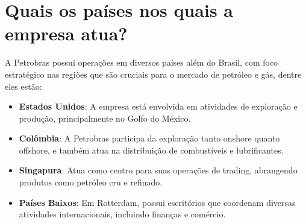 \section{Quais os países nos quais a empresa atua?}

A Petrobras possui operações em diversos países além do Brasil, com foco estratégico nas regiões que são cruciais para o mercado de petróleo e gás, dentre eles estão:

\begin{itemize}
    \item \textbf{Estados Unidos}: A empresa está envolvida em atividades de exploração e produção, principalmente no Golfo do México.
    \item \textbf{Colômbia}: A Petrobras participa da exploração tanto onshore quanto offshore, e também atua na distribuição de combustíveis e lubrificantes.
    \item \textbf{Singapura}: Atua como centro para suas operações de trading, abrangendo produtos como petróleo cru e refinado.
    \item \textbf{Países Baixos}: Em Rotterdam, possui escritórios que coordenam diversas atividades internacionais, incluindo finanças e comércio.
\end{itemize}
